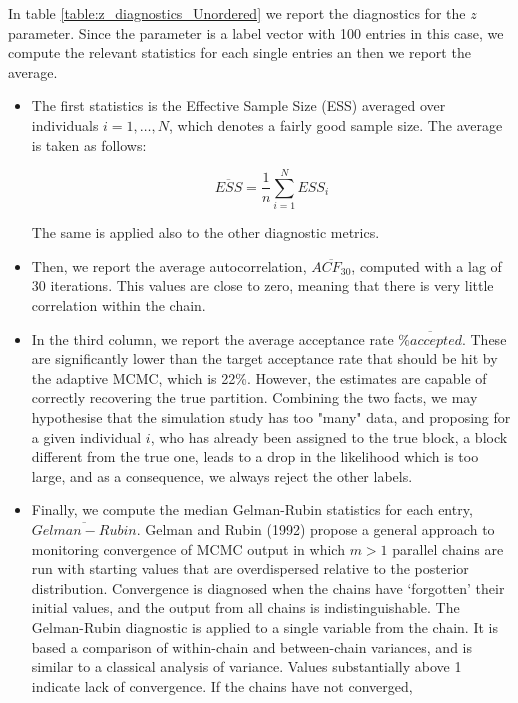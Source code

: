 \documentclass[11pt]{amsart}
\begin{document}
In table \eqref{table:z_diagnostics_Unordered} we report the diagnostics for the $z$ parameter. Since the parameter is a label vector with 100 entries in this case, we compute the relevant statistics for each single entries an then we report the average.
\begin{itemize}

\item The first statistics is the Effective Sample Size (ESS) averaged over individuals $i=1,\dots,N$, which denotes a fairly good sample size. The average is taken as follows:

$$
\overline{ESS} = \frac{1}{n} \sum_{i=1}^N ESS_i
$$

The same is applied also to the other diagnostic metrics.

\item Then, we report the average autocorrelation, $\overline{ACF_{30}}$, computed with a lag of 30 iterations. This values are close to zero, meaning that there is very little correlation within the chain.

\item In the third column, we report the average acceptance rate $\overline{\% accepted}$. These are significantly lower than the target acceptance rate that should be hit by the adaptive MCMC, which is 22\%. However, the estimates are capable of correctly recovering the true partition. Combining the two facts, we may hypothesise that the simulation study has too "many" data, and proposing for a given individual $i$, who has already been assigned to the true block, a block different from the true one, leads to a drop in the likelihood which is too large, and as a consequence, we always reject the other labels. 

\item Finally, we compute the median Gelman-Rubin statistics for each entry, $\overline{Gelman-Rubin}$. Gelman and Rubin (1992) propose a general approach to monitoring convergence of MCMC output in which $m >1$ parallel chains are run with starting values that are overdispersed relative to the posterior distribution. Convergence is diagnosed when the chains have ‘forgotten’ their initial values, and the output from all chains is indistinguishable. The Gelman-Rubin diagnostic is applied to a single variable from the chain. It is based a comparison of within-chain and between-chain variances, and is similar to a classical analysis of variance. Values substantially above 1 indicate lack of convergence. If the chains have not converged,
\end{itemize}
\end{document}
